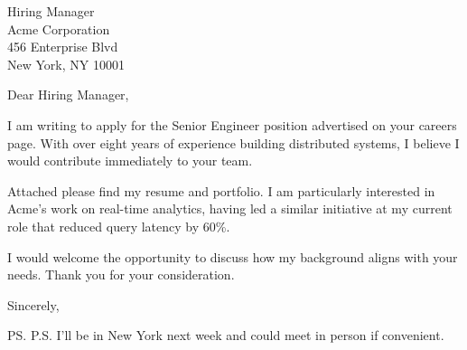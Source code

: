 \documentclass{letter}
\begin{document}
\begin{letter}{Hiring Manager \\ Acme Corporation \\ 456 Enterprise Blvd \\ New York, NY 10001}

\opening{Dear Hiring Manager,}

I am writing to apply for the Senior Engineer position advertised on your careers page. With over eight years of experience building distributed systems, I believe I would contribute immediately to your team.

Attached please find my resume and portfolio. I am particularly interested in Acme's work on real-time analytics, having led a similar initiative at my current role that reduced query latency by 60\%.

I would welcome the opportunity to discuss how my background aligns with your needs. Thank you for your consideration.

\closing{Sincerely,}

\ps{P.S. I'll be in New York next week and could meet in person if convenient.}


\end{letter}
\end{document}
